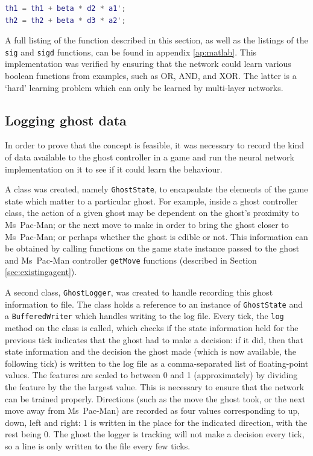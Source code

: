 \begin{lstlisting}[language=Matlab,label=lst:update,caption={Weight update code},captionpos=b]
th1 = th1 + beta * d2 * a1';
th2 = th2 + beta * d3 * a2';
\end{lstlisting}

A full listing of the function described in this section, as well as the listings of the {\tt sig} and {\tt sigd} functions, can be found in appendix \ref{ap:matlab}.  This implementation was verified by ensuring that the network could learn various boolean functions from examples, such as OR, AND, and XOR.  The latter is a `hard' learning problem which can only be learned by multi-layer networks.

\subsection{Logging ghost data}
\label{sec:logging}

In order to prove that the concept is feasible, it was necessary to record the kind of data available to the ghost controller in a game and run the neural network implementation on it to see if it could learn the behaviour.

A class was created, namely {\tt GhostState}, to encapsulate the elements of the game state which matter to a particular ghost.  For example, inside a ghost controller class, the action of a given ghost may be dependent on the ghost's proximity to Ms~Pac-Man; or the next move to make in order to bring the ghost closer to Ms~Pac-Man; or perhaps whether the ghost is edible or not.  This information can be obtained by calling functions on the game state instance passed to the ghost and Ms~Pac-Man controller {\tt getMove} functions (described in Section \ref{sec:existingagent}).

A second class, {\tt GhostLogger}, was created to handle recording this ghost information to file. The class holds a reference to an instance of {\tt GhostState} and a {\tt BufferedWriter} which handles writing to the log file.  Every tick, the {\tt log} method on the class is called, which checks if the state information held for the previous tick indicates that the ghost had to make a decision: if it did, then that state information and the decision the ghost made (which is now available, the following tick) is written to the log file as a comma-separated list of floating-point values.  The features are scaled to between 0 and 1 (approximately) by dividing the feature by the the largest value.  This is necessary to ensure that the network can be trained properly.  Directions (such as the move the ghost took, or the next move away from Ms~Pac-Man) are recorded as four values corresponding to up, down, left and right: 1 is written in the place for the indicated direction, with the rest being 0.  The ghost the logger is tracking will not make a decision every tick, so a line is only written to the file every few ticks.

